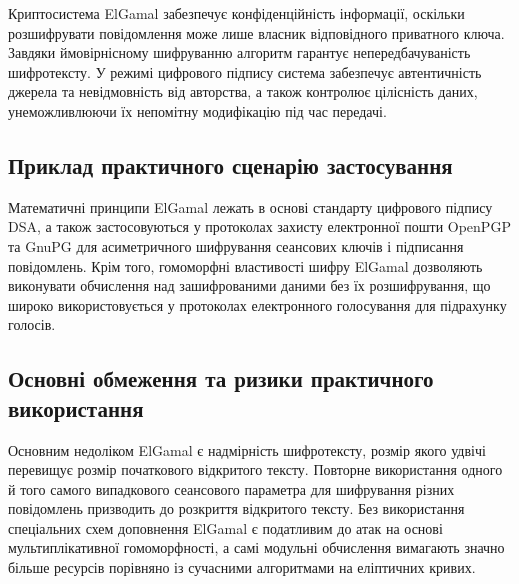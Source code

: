 Криптосистема ElGamal забезпечує конфіденційність інформації, оскільки розшифрувати повідомлення може
лише власник відповідного приватного ключа. Завдяки ймовірнісному шифруванню алгоритм гарантує
непередбачуваність шифротексту. У режимі цифрового підпису система забезпечує автентичність джерела та
невідмовність від авторства, а також контролює цілісність даних, унеможливлюючи їх непомітну модифікацію
під час передачі.

\subsection{Приклад практичного сценарію застосування}

Математичні принципи ElGamal лежать в основі стандарту цифрового підпису DSA, а також застосовуються у
протоколах захисту електронної пошти OpenPGP та GnuPG для асиметричного шифрування сеансових ключів
і підписання повідомлень. Крім того, гомоморфні властивості шифру ElGamal дозволяють виконувати
обчислення над зашифрованими даними без їх розшифрування, що широко використовується у протоколах
електронного голосування для підрахунку голосів.

\subsection{Основні обмеження та ризики практичного використання}

Основним недоліком ElGamal є надмірність шифротексту, розмір якого удвічі перевищує розмір початкового
відкритого тексту. Повторне використання одного й того самого випадкового сеансового параметра для
шифрування різних повідомлень призводить до розкриття відкритого тексту. Без використання спеціальних
схем доповнення ElGamal є податливим до атак на основі мультиплікативної гомоморфності, а самі модульні
обчислення вимагають значно більше ресурсів порівняно із сучасними алгоритмами на еліптичних кривих.
